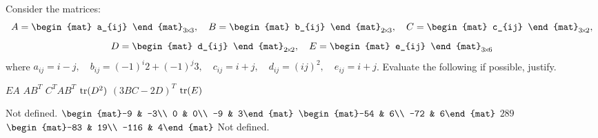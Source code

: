 
\begin{Exercise}[
name={},
title={}, 
difficulty=0,
origin={\cite{YL}}]
Consider the matrices:
\[
A=
\begin{mat}
a_{ij}
\end{mat}_{\nbyn{3}},\quad
B=
\begin{mat}
b_{ij}
\end{mat}_{\nbym{2}{3}},\quad
C=
\begin{mat}
c_{ij}
\end{mat}_{\nbym{3}{2}},
\]
\[
D=
\begin{mat}
d_{ij}
\end{mat}_{\nbyn{2}},\quad
E=
\begin{mat}
e_{ij}
\end{mat}_{\nbym{3}{6}}
\]
where $a_{ij}=i-j,\quad b_{ij}=(-1)^i2+(-1)^j3,\quad c_{ij}=i+j,\quad d_{ij}=(ij)^2,\quad e_{ij}=i+j$.  Evaluate the following if possible, justify.
\begin{multicols}{3}
\Question $EA$
\Question $AB^T$
\Question $C^TAB^T$
\Question $\operatorname{tr}(D^2)$
\Question $(3BC-2D)^T$
\Question $\operatorname{tr}(E)$
\EndCurrentQuestion
\end{multicols}
\end{Exercise}

\begin{Answer}
\Question Not defined.
\Question $\begin{mat}-9 & -3\\ 0 & 0\\ -9 & 3\end{mat}$
\Question $\begin{mat}-54 & 6\\ -72 & 6\end{mat}$
\Question $289$
\Question $\begin{mat}-83 & 19\\ -116 & 4\end{mat}$
\Question Not defined.
\end{Answer}
